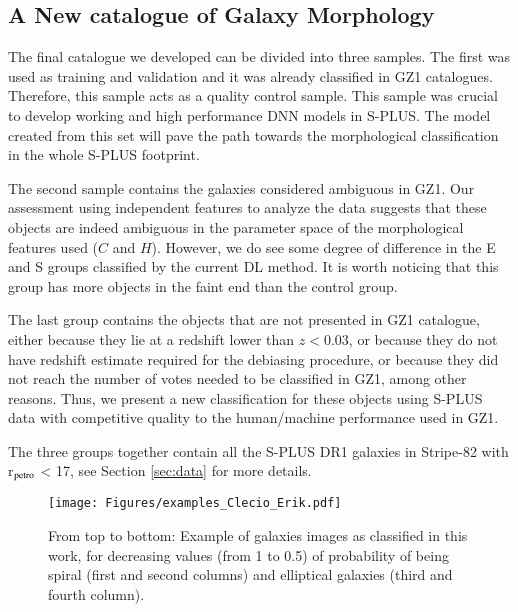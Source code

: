 \documentclass[fleqn,usenatbib]{mnras}
\begin{document}
\subsection{A New catalogue of Galaxy Morphology}
\label{sec:new_catatlogue}
The final catalogue we developed can be divided into three samples. The first was used as training and validation and it was already classified in GZ1 catalogues. Therefore, this sample acts as a quality control sample. This sample was crucial to develop working and high performance DNN models in S-PLUS. The model created from this set will pave the path towards the morphological classification in the whole S-PLUS footprint.

The second sample contains the galaxies considered ambiguous in GZ1. Our assessment using independent features to analyze the data suggests that these objects are indeed ambiguous in the parameter space of the   morphological features used ($C$ and $H$). However, we do see some degree of difference in the E and S groups classified by the current DL method. It is worth noticing that this group has more objects in the faint end than the control group.

The last group contains the objects that are not presented in  GZ1 catalogue, either because they lie at a redshift lower than $z<0.03$, or because they do not have redshift estimate required for the debiasing procedure, or because they did not reach the number of votes needed to be classified in GZ1, among other reasons. Thus, we present a new classification for these objects using S-PLUS data with competitive quality to the human/machine performance used in GZ1.

The three groups together contain all the S-PLUS DR1 galaxies in Stripe-82 with r$_{\rm petro}$ < 17, see Section \ref{sec:data} for more details.

\begin{figure*}
    \centering
    \texttt{[image: Figures/examples\_Clecio\_Erik.pdf]}
    \caption{ From top to bottom: Example of galaxies images as classified in this work, for decreasing values (from 1 to 0.5) of probability of being spiral (first and second columns) and elliptical galaxies (third and fourth column). }
     \label{fig:galaxiestypes}
\end{figure*}
\end{document}

